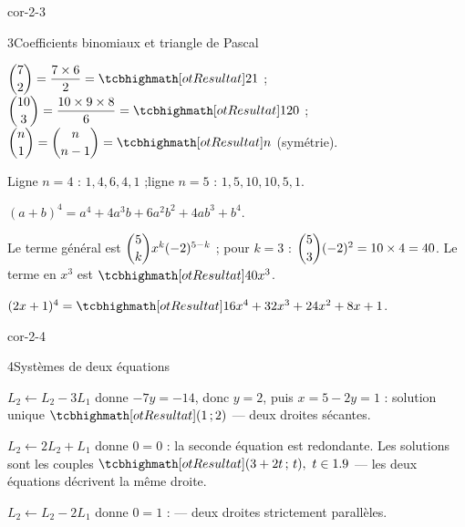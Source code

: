 \begin{blocLivre}{cor-2-3}
\begin{corrige}{3}{Coefficients binomiaux et triangle de Pascal}
\begin{questions}
  \item $\dbinom{7}{2}=\dfrac{7\times6}{2}=\res{21}$ ;\quad
    $\dbinom{10}{3}=\dfrac{10\times9\times8}{6}=\res{120}$ ;\quad
    $\dbinom{n}{1}=\dbinom{n}{n-1}=\res{n}$ (symétrie).
  \item Ligne $n=4$ : $1,4,6,4,1$ ;\quad ligne $n=5$ : $1,5,10,10,5,1$.
  \item $(a+b)^{4}=a^{4}+4a^{3}b+6a^{2}b^{2}+4ab^{3}+b^{4}$.
  \item Le terme général est $\dbinom{5}{k}x^{k}(-2)^{5-k}$ ; pour $k=3$ :
    $\dbinom{5}{3}(-2)^{2}=10\times4=40$. Le terme en $x^{3}$ est $\res{40x^{3}}$.
  \item $(2x+1)^{4}=\res{16x^{4}+32x^{3}+24x^{2}+8x+1}$.
\end{questions}
\end{corrige}
\end{blocLivre}

\begin{blocLivre}{cor-2-4}
\begin{corrige}{4}{Systèmes de deux équations}
\begin{questions}
  \item $L_2\leftarrow L_2-3L_1$ donne $-7y=-14$, donc $y=2$, puis $x=5-2y=1$ :
    solution unique $\res{(1\,;2)}$ — deux droites sécantes.
  \item $L_2\leftarrow2L_2+L_1$ donne $0=0$ : la seconde équation est redondante.
    Les solutions sont les couples $\res{(3+2t\,;\,t),\ t\in\R}$ — les deux
    équations décrivent la même droite.
  \item $L_2\leftarrow L_2-2L_1$ donne $0=1$ :  —
    deux droites strictement parallèles.
\end{questions}
\end{corrige}
\end{blocLivre}

